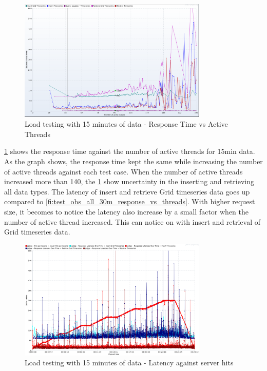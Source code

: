 \begin{figure}[htp]
    \centering
    \includegraphics[width=0.8\textwidth]{results/obs/all/obs_all_15m_response_times_vs_threads.png}
    \caption{Load testing with 15 minutes of data - Response Time vs Active Threads}
    \label{fi:test_obs_all_15m_response_vs_threads}
\end{figure}

\cref{fi:test_obs_all_15m_response_vs_threads} shows the response time against the number of active threads for 15min data. As the graph shows, the response time kept the same while increasing the number of active threads against each test case. When the number of active threads increased more than 140, the \cref{fi:test_obs_all_15m_response_vs_threads} show uncertainty in the inserting and retrieving all data types. The latency of insert and retrieve Grid timeseries data goes up compared to \cref{fi:test_obs_all_30m_response_vs_threads}.
With higher request size, it becomes to notice the latency also increase by a small factor when the number of active thread increased. This can notice on with insert and retrieval of Grid timeseries data.

\begin{figure}[htp]
    \centering
    \includegraphics[width=0.8\textwidth]{results/obs/all/obs_all_15m_res_latencies_against_hits.png}
    \caption{Load testing with 15 minutes of data - Latency against server hits}
    \label{fi:test_obs_all_15m_latency}
\end{figure}

